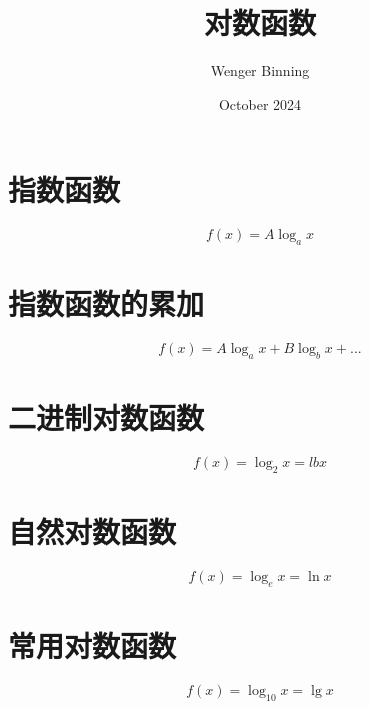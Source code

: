 \documentclass{article}
\title{对数函数}
\author{Wenger Binning }
\date{October 2024}
\begin{document}
\maketitle

\section{指数函数}

$$ f(x) = A\log_{a}x $$

\section{指数函数的累加}

$$ f(x) = A\log_{a}x + B\log_{b}x + ... $$


\section{二进制对数函数}

$$ f(x) = \log_{2}x = lb x $$

\section{自然对数函数}

$$ f(x) = \log_{e}x = \ln x $$

\section{常用对数函数}

$$ f(x) = \log_{10}x = \lg x $$
\end{document}
